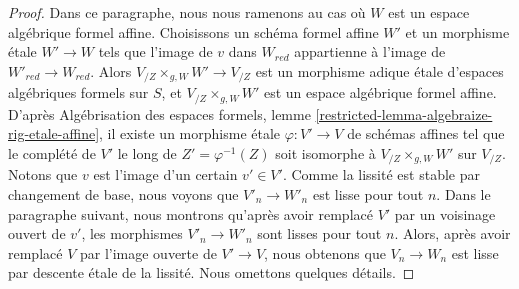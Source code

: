 \begin{proof}
\medskip\noindent
Dans ce paragraphe, nous nous ramenons au cas où $W$ est un espace algébrique
formel affine. Choisissons un schéma formel affine $W'$ et un morphisme \'etale
$W' \to W$ tels que l'image de $v$ dans $W_{red}$ appartienne à
l'image de $W'_{red} \to W_{red}$. Alors $V_{/Z} \times_{g, W} W' \to V_{/Z}$
est un morphisme adique \'etale d'espaces algébriques formels sur $S$,
et $V_{/Z} \times_{g, W} W'$ est un espace algébrique formel affine.
D'après Algébrisation des espaces formels,
lemme \ref{restricted-lemma-algebraize-rig-etale-affine},
il existe un morphisme \'etale $\varphi : V' \to V$ de schémas affines
tel que le complété de $V'$ le long de $Z' = \varphi^{-1}(Z)$
soit isomorphe à $V_{/Z} \times_{g, W} W'$ sur $V_{/Z}$.
Notons que $v$ est l'image d'un certain $v' \in V'$.
Comme la lissité est stable par changement de base, nous voyons que
$V'_n \to W'_n$ est lisse pour tout $n$. Dans le paragraphe suivant,
nous montrons qu'après avoir remplacé $V'$ par un voisinage ouvert de $v'$,
les morphismes $V'_n \to W'_n$ sont lisses pour tout $n$.
Alors, après avoir remplacé $V$ par l'image ouverte de $V' \to V$,
nous obtenons que $V_n \to W_n$ est lisse par descente \'etale de la lissité.
Nous omettons quelques détails.


\end{proof}
